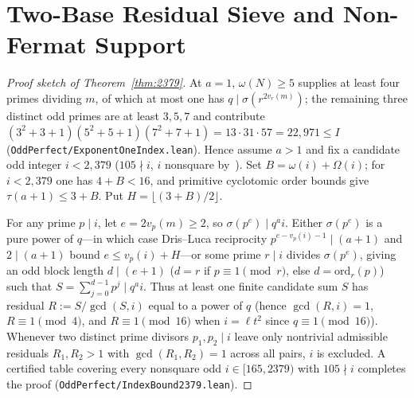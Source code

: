 \documentclass[11pt]{amsart}
\theoremstyle{definition}
\theoremstyle{remark}
\begin{document}
\section{Two-Base Residual Sieve and Non-Fermat Support}

\begin{proof}[Proof sketch of Theorem~\ref{thm:2379}]
At $a = 1$, $\omega(N) \ge 5$ supplies at least four primes dividing $m$, of which at most one has $q \mid \sigma(r^{2 v_r(m)})$; the remaining three distinct odd primes are at least $3, 5, 7$ and contribute $(3^2 + 3 + 1)(5^2 + 5 + 1)(7^2 + 7 + 1) = 13 \cdot 31 \cdot 57 = 22{,}971 \le I$ (\texttt{OddPerfect/ExponentOneIndex.lean}). Hence assume $a > 1$ and fix a candidate odd integer $i < 2{,}379$ ($105 \nmid i$, $i$ nonsquare by~\cite{Hirakawa2024}). Set $B = \omega(i) + \Omega(i)$; for $i < 2{,}379$ one has $4 + B < 16$, and primitive cyclotomic order bounds give $\tau(a + 1) \le 3 + B$. Put $H = \lfloor (3 + B)/2 \rfloor$.

For any prime $p \mid i$, let $e = 2 v_p(m) \ge 2$, so $\sigma(p^e) \mid q^a i$. Either $\sigma(p^e)$ is a pure power of $q$---in which case Dris--Luca reciprocity $p^{e - v_p(i) - 1} \mid (a + 1)$ and $2 \mid (a + 1)$ bound $e \le v_p(i) + H$---or some prime $r \mid i$ divides $\sigma(p^e)$, giving an odd block length $d \mid (e + 1)$ ($d = r$ if $p \equiv 1 \pmod r$, else $d = \mathrm{ord}_r(p)$) such that $S = \sum_{j=0}^{d-1} p^j \mid q^a i$. Thus at least one finite candidate sum $S$ has residual $R := S / \gcd(S, i)$ equal to a power of $q$ (hence $\gcd(R, i) = 1$, $R \equiv 1 \pmod 4$, and $R \equiv 1 \pmod{16}$ when $i = \ell t^2$ since $q \equiv 1 \pmod{16}$). Whenever two distinct prime divisors $p_1, p_2 \mid i$ leave only nontrivial admissible residuals $R_1, R_2 > 1$ with $\gcd(R_1, R_2) = 1$ across all pairs, $i$ is excluded. A certified table covering every nonsquare odd $i \in [165, 2379)$ with $105 \nmid i$ completes the proof (\texttt{OddPerfect/IndexBound2379.lean}).
\end{proof}
\end{document}
